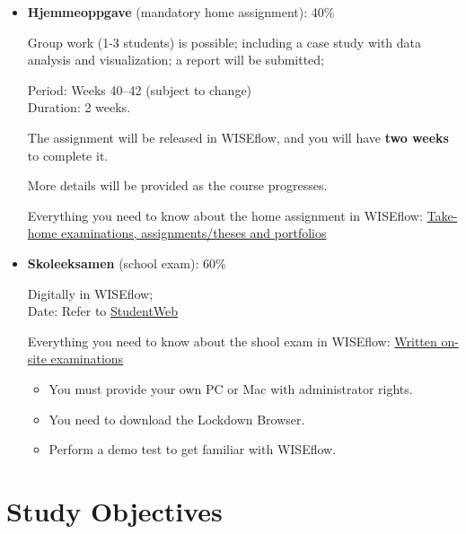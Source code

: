 \documentclass[
  12pt,
  a4paper,
]{scrbook}
\providecommand{\tightlist}{%
  \setlength{\itemsep}{0pt}\setlength{\parskip}{0pt}}
\renewcommand{\tightlist}{\setlength{\itemsep}{0.5\baselineskip}\setlength{\parskip}{0.2\baselineskip}}
\theoremstyle{plain}
\theoremstyle{definition}
\theoremstyle{remark}
\begin{document}
\begin{itemize}
\item
  \textbf{Hjemmeoppgave} (mandatory home assignment): 40\%

  Group work (1-3 students) is possible; including a case study with
  data analysis and visualization; a report will be submitted;

  Period: Weeks 40--42 (subject to change)\\
  Duration: 2 weeks.

  The assignment will be released in WISEflow, and you will have
  \textbf{two weeks} to complete it.

  More details will be provided as the course progresses.

  Everything you need to know about the home assignment in WISEflow:
  \href{https://www.nord.no/en/student/examinations-and-assessment/take-home-examinations-assignments-and-portfolios}{Take-home
  examinations, assignments/theses and portfolios}
\item
  \textbf{Skoleeksamen} (school exam): 60\%

  Digitally in WISEflow;\\
  Date: Refer to
  \href{https://www.nord.no/student/studentverktoy/studentweb}{StudentWeb}

  Everything you need to know about the shool exam in WISEflow:
  \href{https://www.nord.no/en/student/examinations-and-assessment/written-on-site-examinations}{Written
  on-site examinations}

  \begin{itemize}
  \tightlist
  \item
    You must provide your own PC or Mac with administrator rights.
  \item
    You need to download the Lockdown Browser.
  \item
    Perform a demo test to get familiar with WISEflow.
  \end{itemize}
\end{itemize}

\section{Study Objectives}\label{study-objectives}
\end{document}
